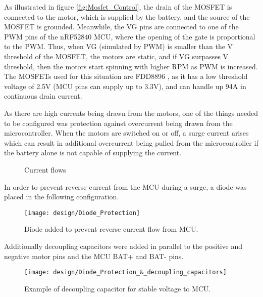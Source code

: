 As illustrated in figure \ref{fig:Mosfet_Control}, the drain of the MOSFET is connected to the motor, which is supplied by 
the battery, and the source of the MOSFET is grounded. Meanwhile, the VG pins are connected to one of the PWM pins 
of the nRF52840 MCU, where the opening of the gate is proportional to the PWM. Thus, when VG (simulated by PWM) is 
smaller than the V threshold of the MOSFET, the motors are static, and if VG surpasses V threshold, then the motors 
start spinning with higher RPM as PWM is increased. 
The MOSFETs used for this situation are FDD8896 \cite{FDD8896}, as it has 
a low threshold voltage of 2.5V (MCU pins can supply 
up to 3.3V), and can handle up 94A in continuous drain 
current.

As there are high currents being drawn from the motors, one of the things needed to be configured was protection 
against overcurrent being drawn from the microcontroller. When the motors are switched on or off, 
a surge current arises which can result in additional overcurrent being pulled from the microcontroller if 
the battery alone is not capable of supplying the current. 


\begin{figure}[H]%
    \centering
    \qquad
    \caption{Current flows}%
    \label{fig:example}%
\end{figure}


In order to prevent reverse current from the MCU 
during a surge, a diode was placed in the following 
configuration. 

\begin{figure}[H]
    \begin{center}
    \texttt{[image: design/Diode\_Protection]}
    \end{center}
    \caption{Diode added to prevent reverse current flow from MCU.}
    \label{fig:Diode_Protection}
\end{figure}

Additionally decoupling capacitors were added in 
parallel to the positive and negative motor pins 
and the MCU BAT+ and BAT- pins.

\begin{figure}[H]
    \begin{center}
    \texttt{[image: design/Diode\_Protection\_\&\_decoupling\_capacitors]}
    \end{center}
    \caption{Example of decoupling capacitor for stable voltage to MCU.}
    \label{fig:Diode_Protection_&_decoupling_capacitors}
\end{figure}

